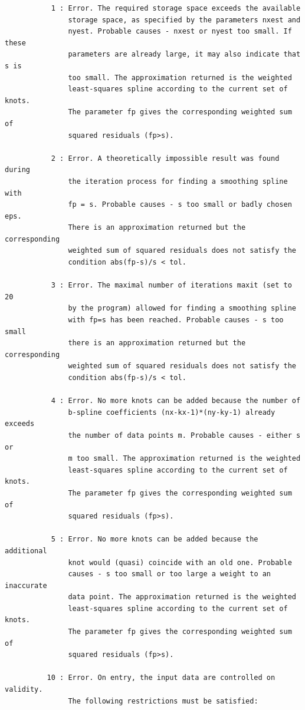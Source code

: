 \documentclass[11pt,twoside]{article}
\begin{document}
\begin{verbatim}
           1 : Error. The required storage space exceeds the available
               storage space, as specified by the parameters nxest and
               nyest. Probable causes - nxest or nyest too small. If these
               parameters are already large, it may also indicate that s is
               too small. The approximation returned is the weighted
               least-squares spline according to the current set of knots.
               The parameter fp gives the corresponding weighted sum of
               squared residuals (fp>s).

           2 : Error. A theoretically impossible result was found during
               the iteration process for finding a smoothing spline with
               fp = s. Probable causes - s too small or badly chosen eps.
               There is an approximation returned but the corresponding
               weighted sum of squared residuals does not satisfy the
               condition abs(fp-s)/s < tol.

           3 : Error. The maximal number of iterations maxit (set to 20
               by the program) allowed for finding a smoothing spline
               with fp=s has been reached. Probable causes - s too small
               there is an approximation returned but the corresponding
               weighted sum of squared residuals does not satisfy the
               condition abs(fp-s)/s < tol.

           4 : Error. No more knots can be added because the number of
               b-spline coefficients (nx-kx-1)*(ny-ky-1) already exceeds
               the number of data points m. Probable causes - either s or
               m too small. The approximation returned is the weighted
               least-squares spline according to the current set of knots.
               The parameter fp gives the corresponding weighted sum of
               squared residuals (fp>s).

           5 : Error. No more knots can be added because the additional
               knot would (quasi) coincide with an old one. Probable
               causes - s too small or too large a weight to an inaccurate
               data point. The approximation returned is the weighted
               least-squares spline according to the current set of knots.
               The parameter fp gives the corresponding weighted sum of
               squared residuals (fp>s).

          10 : Error. On entry, the input data are controlled on validity.
               The following restrictions must be satisfied:


\end{verbatim}
\end{document}
